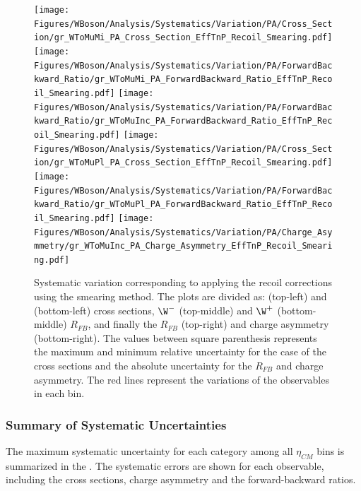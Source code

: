 \begin{figure}[!htbp]
 \begin{center}
  \texttt{[image: Figures/WBoson/Analysis/Systematics/Variation/PA/Cross\_Section/gr\_WToMuMi\_PA\_Cross\_Section\_EffTnP\_Recoil\_Smearing.pdf]}
  \texttt{[image: Figures/WBoson/Analysis/Systematics/Variation/PA/ForwardBackward\_Ratio/gr\_WToMuMi\_PA\_ForwardBackward\_Ratio\_EffTnP\_Recoil\_Smearing.pdf]}
  \texttt{[image: Figures/WBoson/Analysis/Systematics/Variation/PA/ForwardBackward\_Ratio/gr\_WToMuInc\_PA\_ForwardBackward\_Ratio\_EffTnP\_Recoil\_Smearing.pdf]}
  \texttt{[image: Figures/WBoson/Analysis/Systematics/Variation/PA/Cross\_Section/gr\_WToMuPl\_PA\_Cross\_Section\_EffTnP\_Recoil\_Smearing.pdf]}
  \texttt{[image: Figures/WBoson/Analysis/Systematics/Variation/PA/ForwardBackward\_Ratio/gr\_WToMuPl\_PA\_ForwardBackward\_Ratio\_EffTnP\_Recoil\_Smearing.pdf]}
  \texttt{[image: Figures/WBoson/Analysis/Systematics/Variation/PA/Charge\_Asymmetry/gr\_WToMuInc\_PA\_Charge\_Asymmetry\_EffTnP\_Recoil\_Smearing.pdf]}
 \end{center}
 \caption{Systematic variation corresponding to applying the recoil corrections using the smearing method. The plots are divided as: \WToMuNuMi (top-left) and \WToMuNuPl (bottom-left) cross sections, $\W^{-}$ (top-middle) and $\W^{+}$ (bottom-middle) $R_{FB}$, and finally the \W $R_{FB}$ (top-right) and \W charge asymmetry (bottom-right). The values between square parenthesis represents the maximum and minimum relative uncertainty for the case of the cross sections and the absolute uncertainty for the $R_{FB}$ and charge asymmetry. The red lines represent the variations of the observables in each bin.}
 \label{fig:Recoil_Smearing}
\end{figure}

\clearpage
\subsubsection{Summary of Systematic Uncertainties}

The maximum systematic uncertainty for each category among all $\eta_{CM}$ bins is summarized in the . The systematic errors are shown for each observable, including the \W cross sections, \W charge asymmetry and the forward-backward ratios.




